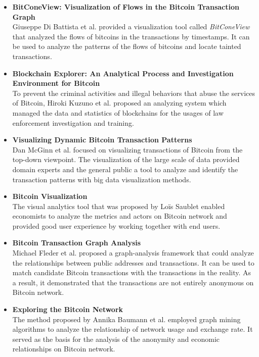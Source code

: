 \begin{itemize}
    \item \textbf{BitConeView: Visualization of Flows in the Bitcoin Transaction Graph} \cite{Battista2015} \\
        Giuseppe Di Battista et al. provided a visualization tool called \textit{BitConeView} that analyzed the flows of bitcoins in the transactions by timestamps. It can be used to analyze the patterns of the flows of bitcoins and locate tainted transactions.
    \item \textbf{Blockchain Explorer: An Analytical Process and Investigation Environment for Bitcoin} \cite{Kuzuno2017} \\
        To prevent the criminal activities and illegal behaviors that abuse the services of Bitcoin, Hiroki Kuzuno et al. proposed an analyzing system which managed the data and statistics of blockchains for the usages of law enforcement investigation and training.
    \item \textbf{Visualizing Dynamic Bitcoin Transaction Patterns} \cite{McGinn2016} \\
        Dan McGinn et al. focused on visualizing transactions of Bitcoin from the top-down viewpoint. The visualization of the large scale of data provided domain experts and the general public a tool to analyze and identify the transaction patterns with big data visualization methods.
    \item \textbf{Bitcoin Visualization} \cite{Saublet2015} \\
        The visual analytics tool that was proposed by Loïs Saublet enabled economists to analyze the metrics and actors on Bitcoin network and provided good user experience by working together with end users.
    \item \textbf{Bitcoin Transaction Graph Analysis} \cite{Fleder2015} \\
        Michael Fleder et al. proposed a graph-analysis framework that could analyze the relationships between public addresses and transactions. It can be used to match candidate Bitcoin transactions with the transactions in the reality. As a result, it demonstrated that the transactions are not entirely anonymous on Bitcoin network.
    \item \textbf{Exploring the Bitcoin Network} \cite{Baumann2014} \\
        The method proposed by Annika Baumann et al. employed graph mining algorithms to analyze the relationship of network usage and exchange rate. It served as the basis for the analysis of the anonymity and economic relationships on Bitcoin network.
\end{itemize}

